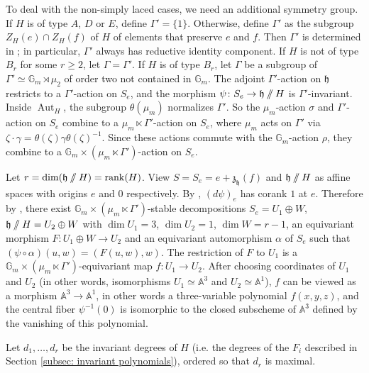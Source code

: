 \documentclass{article} %
\numberwithin{equation}{section}
\theoremstyle{definition}
\newcommand{\G}{\mathbb{G}}
\DeclareMathOperator{\Aut}{Aut}
\DeclareMathOperator{\rank}{rank}
\newcommand{\A}{\mathbb{A}}
\newcommand{\GIT}{\mathbin{/\mkern-6mu/}}
\newcommand{\frakh}{\mathfrak h}
\newcommand{\frakz}{\mathfrak z}
\newcommand{\rl}{r} %
\begin{document}
To deal with the non-simply laced cases, we need an additional symmetry group.
If $H$ is of type $A$, $D$ or $E$, define $\Gamma' = \{1\}$.
Otherwise, define $\Gamma'$ as the subgroup $Z_H(e)\cap Z_H(f)$ of $H$ of elements that preserve $e$ and $f$.
Then $\Gamma'$ is determined in \cite[Section 7.4, Lemma 4]{Slodowy-simplesingularitiesalggroups}; in particular, $\Gamma'$ always has reductive identity component.
If $H$ is not of type $B_{\rl}$ for some $\rl\geq 2$, let $\Gamma = \Gamma'$.
If $H$ is of type $B_{\rl}$, let $\Gamma$ be a subgroup of $\Gamma' \simeq \G_m \rtimes \mu_2$ of order two not contained in $\G_m$.
The adjoint $\Gamma'$-action on $\frakh$ restricts to a $\Gamma'$-action on $S_e$, and the morphism $\psi\colon S_e\rightarrow \frakh \GIT H$ is $\Gamma'$-invariant.
Inside $\Aut_H$, the subgroup $\theta(\mu_m)$ normalizes $\Gamma'$.
So the $\mu_m$-action $\sigma$ and $\Gamma'$-action on $S_e$ combine to a $\mu_m \ltimes \Gamma'$-action on $S_e$, where $\mu_m$ acts on $\Gamma'$ via $\zeta\cdot \gamma = \theta(\zeta) \gamma\theta(\zeta)^{-1}$.
Since these actions commute with the $\G_m$-action $\rho$, they combine to a $\G_m \times (\mu_m \ltimes \Gamma')$-action on $S_e$.




Let $r = \dim(\frakh \GIT H) = \rank(H)$. 
View $S = S_e = e + \frakz_{\frakh}(f)$ and $\frakh\GIT H$ as affine spaces with origins $e$ and $0$ respectively.
By \cite[Section 8.3, Proposition 1]{Slodowy-simplesingularitiesalggroups}, $(d\psi)_e$ has corank $1$ at $e$.
Therefore by \cite[Section 8.1, Lemma 2]{Slodowy-simplesingularitiesalggroups}, there exist $\G_m \times (\mu_m \ltimes \Gamma')$-stable decompositions $S_e = U_1 \oplus W$, $\frakh \GIT H = U_2 \oplus W$ with $\dim U_1 = 3$, $\dim U_2 = 1$, $\dim W =  r-1$, an equivariant morphism $F\colon  U_1 \oplus W \rightarrow U_2$ and an equivariant automorphism $\alpha$ of $S_e$ such that $(\psi\circ \alpha)(u,w)=(F(u,w),w)$.
The restriction of $F$ to $U_1$ is a $\G_m \times(\mu_m\ltimes \Gamma')$-equivariant map $f\colon U_1\rightarrow U_2$.
After choosing coordinates of $U_1$ and $U_2$ (in other words, isomorphisms $U_1\simeq \A^3$ and $U_2\simeq \A^1$), $f$ can be viewed as a morphism $\mathbb{A}^3 \rightarrow \mathbb{A}^1$, in other words a three-variable polynomial $f(x,y,z)$, and the central fiber $\psi^{-1}(0)$ is isomorphic to the closed subscheme of $\A^3$ defined by the vanishing of this polynomial.

Let $d_1, \dots, d_r$ be the invariant degrees of $H$ (i.e. the degrees of the $F_i$ described in Section \ref{subsec: invariant polynomials}), ordered so that $d_r$ is maximal.
\end{document}
